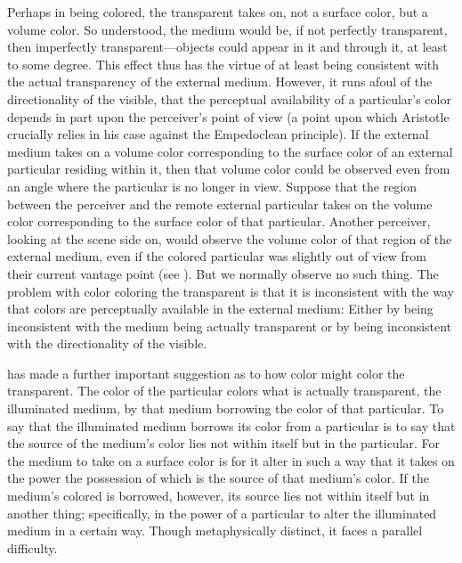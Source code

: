 Perhaps in being colored, the transparent takes on, not a surface color, but a volume color. So understood, the medium would be, if not perfectly transparent, then imperfectly transparent---objects could appear in it and through it, at least to some degree. This effect thus has the virtue of at least being consistent with the actual transparency of the external medium. However, it runs afoul of the directionality of the visible, that the perceptual availability of a particular's color depends in part upon the perceiver's point of view (a point upon which Aristotle crucially relies in his case against the Empedoclean principle). If the external medium takes on a volume color corresponding to the surface color of an external particular residing within it, then that volume color could be observed even from an angle where the particular is no longer in view. Suppose that the region between the perceiver and the remote external particular takes on the volume color corresponding to the surface color of that particular. Another perceiver, looking at the scene side on, would observe the volume color of that region of the external medium, even if the colored particular was slightly out of view from their current vantage point (see \citealt[425]{Burnyeat:1995fk}). But we normally observe no such thing. The problem with color coloring the transparent is that it is inconsistent with the way that colors are perceptually available in the external medium: Either by being inconsistent with the medium being actually transparent or by being inconsistent with the directionality of the visible.

\citet{Sorabji:2004fk} has made a further important suggestion as to how color might color the transparent. The color of the particular colors what is actually transparent, the illuminated medium, by that medium borrowing the color of that particular. To say that the illuminated medium borrows its color from a particular is to say that the source of the medium's color lies not within itself but in the particular. For the medium to take on a surface color is for it alter in such a way that it takes on the power the possession of which is the source of that medium's color. If the medium's colored is borrowed, however, its source lies not within itself but in another thing; specifically, in the power of a particular to alter the illuminated medium in a certain way. Though metaphysically distinct, it faces a parallel difficulty. 

